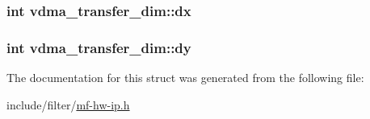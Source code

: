 \subsubsection[{\texorpdfstring{dx}{dx}}]{\setlength{\rightskip}{0pt plus 5cm}int vdma\+\_\+transfer\+\_\+dim\+::dx}\hypertarget{structvdma__transfer__dim_a35aa29bbfcd3f86ed0bd78c9bf32cb71}{}\label{structvdma__transfer__dim_a35aa29bbfcd3f86ed0bd78c9bf32cb71}
\subsubsection[{\texorpdfstring{dy}{dy}}]{\setlength{\rightskip}{0pt plus 5cm}int vdma\+\_\+transfer\+\_\+dim\+::dy}\hypertarget{structvdma__transfer__dim_aa036b394a5a9b51a283bc55e9211a7e8}{}\label{structvdma__transfer__dim_aa036b394a5a9b51a283bc55e9211a7e8}


The documentation for this struct was generated from the following file\+:\begin{DoxyCompactItemize}
\item 
include/filter/\hyperlink{mf-hw-ip_8h}{mf-\/hw-\/ip.\+h}\end{DoxyCompactItemize}
